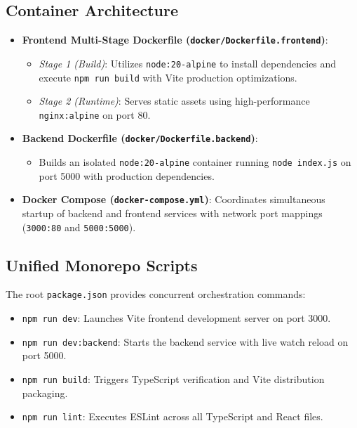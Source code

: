 \documentclass[11pt,a4paper]{article}
\begin{document}
\subsection{Container Architecture}
\begin{itemize}[leftmargin=1.5em]
    \item \textbf{Frontend Multi-Stage Dockerfile (\texttt{docker/Dockerfile.frontend})}:
    \begin{itemize}
        \item \textit{Stage 1 (Build)}: Utilizes \texttt{node:20-alpine} to install dependencies and execute \texttt{npm run build} with Vite production optimizations.
        \item \textit{Stage 2 (Runtime)}: Serves static assets using high-performance \texttt{nginx:alpine} on port 80.
    \end{itemize}
    \item \textbf{Backend Dockerfile (\texttt{docker/Dockerfile.backend})}:
    \begin{itemize}
        \item Builds an isolated \texttt{node:20-alpine} container running \texttt{node index.js} on port 5000 with production dependencies.
    \end{itemize}
    \item \textbf{Docker Compose (\texttt{docker-compose.yml})}: Coordinates simultaneous startup of backend and frontend services with network port mappings (\texttt{3000:80} and \texttt{5000:5000}).
\end{itemize}

\subsection{Unified Monorepo Scripts}
The root \texttt{package.json} provides concurrent orchestration commands:
\begin{itemize}[leftmargin=1.5em]
    \item \texttt{npm run dev}: Launches Vite frontend development server on port 3000.
    \item \texttt{npm run dev:backend}: Starts the backend service with live watch reload on port 5000.
    \item \texttt{npm run build}: Triggers TypeScript verification and Vite distribution packaging.
    \item \texttt{npm run lint}: Executes ESLint across all TypeScript and React files.
\end{itemize}
\end{document}
